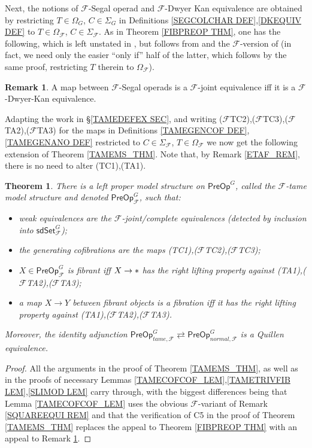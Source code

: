 \documentclass[a4paper,10pt
,draft
]{article}%
\numberwithin{equation}{section}
\numberwithin{figure}{section}
\newtheorem{theorem}[equation]{Theorem}%
\theoremstyle{definition} %
\newtheorem{remark}[equation]{Remark}%
\newcommand{\F}{\ensuremath{\mathcal F}}
\newcommand{\1}{\ensuremath{\mathbbm 1}}%
\begin{document}
Next, the notions of $\F$-Segal operad and 
$\F$-Dwyer Kan equivalence are obtained 
by restricting $T\in \Omega_G$, $C \in \Sigma_G$
in Definitions \ref{SEGCOLCHAR DEF},\ref{DKEQUIV DEF}
to $T\in \Omega_\F$, $C \in \Sigma_\F$.
As in Theorem \ref{FIBPREOP THM},
one has the following,
which is left unstated in \cite[\S 6]{BP_edss},
but follows from \cite[Thm. 6.9]{BP_edss}
and the $\F$-version of \cite[Cor. 5.51]{BP_edss}
(in fact, we need only the easier ``only if'' half of the latter,
which follows by the same proof, 
restricting $T$ therein to $\Omega_\F$).
%
\begin{remark}\label{FIBPREOPF REM}	
	A map between $\F$-Segal operads is a 
	$\F$-joint equivalence iff it is a $\F$-Dwyer-Kan equivalence.
\end{remark}



Adapting the work in \S \ref{TAMEDEFEX SEC},
and writing 
($\F$TC2),($\F$TC3),($\F$TA2),($\F$TA3)
for the maps in Definitions \ref{TAMEGENCOF DEF},\ref{TAMEGENANO DEF}
restricted to $C \in \Sigma_\F$, $T \in \Omega_\F$ we now get the following extension of Theorem \ref{TAMEMS_THM}.
Note that, by Remark \ref{ETAF_REM},
there is no need to alter (TC1),(TA1).

\begin{theorem}\label{TAMEMSF_THM}
	There is a left proper model structure on 
	$\mathsf{PreOp}^G$,
	called the \emph{$\F$-tame model structure}
	and denoted $\mathsf{PreOp}^G_{\F}$,
	such that:
	\begin{itemize}
		\item weak equivalences are the 
		$\F$-joint/complete equivalences 
		(detected by inclusion into $\mathsf{sdSet}^G_{\F}$);
		\item the generating cofibrations are the maps (TC1),($\F$TC2),($\F$TC3);
		\item $X \in \mathsf{PreOp}^G_{\F}$ is fibrant iff
		$X \to \**$ has the right lifting property against 
		(TA1),($\F$TA2),($\F$TA3);
		\item a map $X \to Y$ between fibrant objects is a fibration iff
		it has the right lifting property against 
		(TA1),($\F$TA2),($\F$TA3).
	\end{itemize}
	Moreover, the identity adjunction
	$
	\mathsf{PreOp}^G_{tame,\F}
	\rightleftarrows
	\mathsf{PreOp}^G_{normal,\F} 
	$
	is a Quillen equivalence.
\end{theorem}


\begin{proof}
	All the arguments in the proof of Theorem \ref{TAMEMS_THM},
	as well as in the proofs of necessary 
	Lemmas \ref{TAMECOFCOF_LEM},\ref{TAMETRIVFIB LEM},\ref{SLIMOD LEM}
	carry through, 
	with the biggest differences being that 
	Lemma \ref{TAMECOFCOF_LEM} 
	uses the obvious $\F$-variant of Remark \ref{SQUAREEQUI REM}
	and that the verification of C5 in the proof of Theorem \ref{TAMEMS_THM} replaces the appeal to 
	Theorem \ref{FIBPREOP THM} with an appeal to 
	Remark \ref{FIBPREOPF REM}.
\end{proof}
\end{document}

